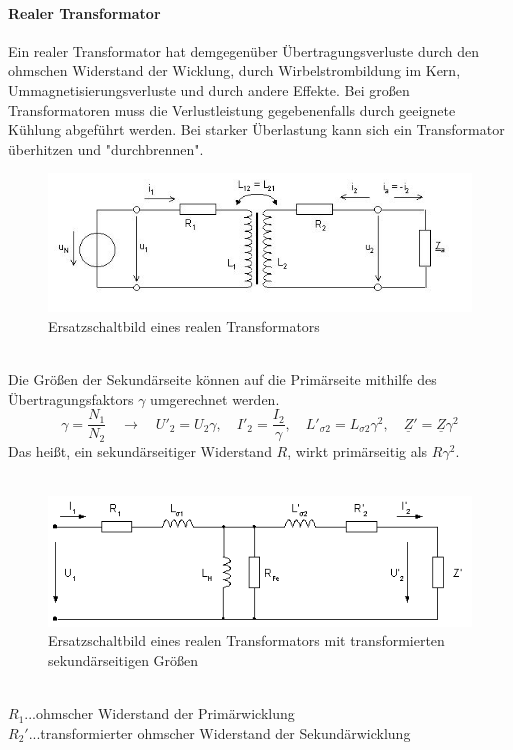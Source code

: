 				\paragraph*{Realer Transformator}
					Ein realer Transformator hat demgegenüber Übertragungsverluste durch den ohmschen Widerstand der Wicklung, durch Wirbelstrombildung im Kern, Ummagnetisierungsverluste und durch andere Effekte. Bei großen Transformatoren muss die Verlustleistung gegebenenfalls durch geeignete Kühlung abgeführt werden. Bei starker Überlastung kann sich ein Transformator überhitzen und "durchbrennen".
					\begin{figure}[h]
						\centering
						\includegraphics[width=0.7\linewidth]{./pics/el/trafo3}
						\caption{Ersatzschaltbild eines realen Transformators}
					\end{figure}\\
					Die Größen der Sekundärseite können auf die Primärseite mithilfe des Übertragungsfaktors $ \gamma $ umgerechnet werden.
					\[\gamma = \frac{N_{1}}{N_{2}} \quad \rightarrow \quad U'_{2}=U_{2}\gamma, \quad I'_{2}=\dfrac{I_{2}}{\gamma}, \quad L'_{\sigma2}=L_{\sigma2}\gamma^{2}, \quad \underline{Z}'=\underline{Z}\gamma^{2} \]
					Das heißt, ein sekundärseitiger Widerstand $ R $, wirkt primärseitig als $ R\gamma^{2} $.\\\\
					\begin{figure}[h]
						\centering
						\includegraphics[width=0.7\linewidth]{./pics/el/trafo1.png}
						\caption{Ersatzschaltbild eines realen Transformators mit transformierten sekundärseitigen Größen}
					\end{figure}\\
					\tab[1cm] $R_{1}$\tab...\tab ohmscher Widerstand der Primärwicklung \\
					\tab[1cm] $R_{2}'$\tab...\tab transformierter ohmscher Widerstand der Sekundärwicklung \\
